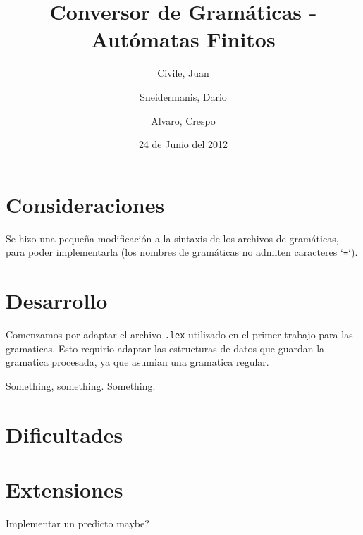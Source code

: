 \documentclass[11pt,a4paper,titlepage]{article}
\title{Conversor de Gramáticas - Autómatas Finitos}
\author{Civile, Juan \and Sneidermanis, Dario \and Alvaro, Crespo}
\date{24 de Junio del 2012}
\begin{document}
\newcommand{\awesome}[1]{\texttt{\large #1}}

\maketitle
\tableofcontents
\clearpage

\section{Consideraciones}
Se hizo una pequeña modificación a la sintaxis de los archivos de gramáticas, para poder implementarla (los nombres de gramáticas no admiten caracteres `\texttt{=}`).

\section{Desarrollo}
Comenzamos por adaptar el archivo \texttt{.lex} utilizado en el primer trabajo para las gramaticas.
Esto requirio adaptar las estructuras de datos que guardan la gramatica procesada, ya que asumian una gramatica regular.

Something, something. Something.

\section{Dificultades}

\section{Extensiones}
Implementar un predicto maybe?
\end{document}
